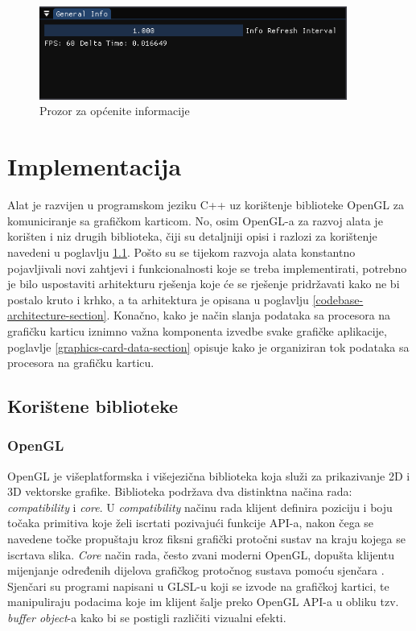 \documentclass[times, utf8, diplomski]{fer}
\begin{document}
\begin{figure} [H]
	\centering
    \includegraphics[width=0.9\textwidth]{general_info.png}
    \caption{Prozor za općenite informacije\\}
    \label{fig:general-info}
\end{figure}

\chapter{Implementacija}

Alat je razvijen u programskom jeziku C++ uz korištenje biblioteke OpenGL za komuniciranje sa grafičkom karticom. No, osim OpenGL-a za razvoj alata je korišten i niz drugih biblioteka, čiji su detaljniji opisi i razlozi za korištenje navedeni u poglavlju \ref{libraries-section}. Pošto su se tijekom razvoja alata konstantno pojavljivali novi zahtjevi i funkcionalnosti koje se treba implementirati, potrebno je bilo uspostaviti arhitekturu rješenja koje će se rješenje pridržavati kako ne bi postalo kruto i krhko, a ta arhitektura je opisana u poglavlju \ref{codebase-architecture-section}. Konačno, kako je način slanja podataka sa procesora na grafičku karticu iznimno važna komponenta izvedbe svake grafičke aplikacije, poglavlje \ref{graphics-card-data-section} opisuje kako je organiziran tok podataka sa procesora na grafičku karticu.

\section{Korištene biblioteke} \label{libraries-section}

\subsection{OpenGL}

OpenGL\citep{opengl} je višeplatformska i višejezična biblioteka koja služi za prikazivanje 2D i 3D vektorske grafike. Biblioteka podržava dva distinktna načina rada: \textit{compatibility} i \textit{core}. U \textit{compatibility} načinu rada klijent definira poziciju i boju točaka primitiva koje želi iscrtati pozivajući funkcije API-a, nakon čega se navedene točke propuštaju kroz fiksni grafički protočni sustav na kraju kojega se iscrtava slika. \textit{Core} način rada, često zvani moderni OpenGL, dopušta klijentu mijenjanje određenih dijelova grafičkog protočnog sustava pomoću sjenčara . Sjenčari su programi napisani u GLSL-u  koji se izvode na grafičkoj kartici, te manipuliraju podacima koje im klijent šalje preko OpenGL API-a u obliku tzv. \textit{buffer object}-a kako bi se postigli različiti vizualni efekti.\\
\end{document}

